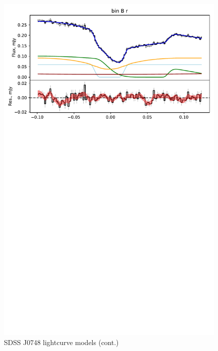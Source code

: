 \begin{figure}
    \centering
    \includegraphics[width=\textwidth]{figures/results/SDSS0748/SDSS0748_3.pdf}
    \caption{SDSS J0748 lightcurve models (cont.)}
    \label{fig:SDSS J0748 all lightcurves cont 2}
\end{figure}
